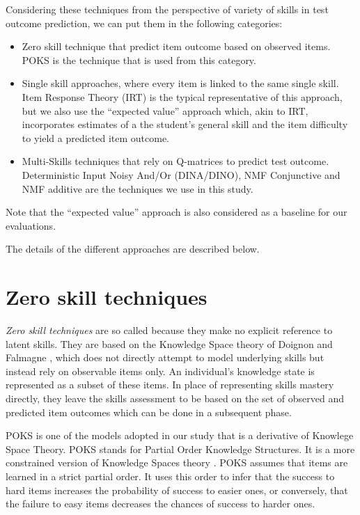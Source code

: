 Considering these techniques from the perspective of variety of skills in test outcome prediction, we can put them in the following categories: 

\begin{itemize}

\item Zero skill technique that predict item outcome based on observed items. POKS is the technique that is used from this category.
\item Single skill approaches, where every item is linked to the same single skill. Item Response Theory (IRT) is the typical representative of this approach, but we also use the ``expected value'' approach which, akin to IRT, incorporates estimates of a the student's general skill and the item difficulty to yield a predicted item outcome.
\item Multi-Skills techniques that rely on Q-matrices to predict test outcome.  Deterministic Input Noisy And/Or (DINA/DINO), NMF Conjunctive and \ac{NMF} additive are the techniques we use in this study.

\end{itemize}  
Note that the ``expected value'' approach is also considered as a baseline for our evaluations. 

The details of the different approaches are described below.

\section{Zero skill techniques}

\textit{Zero skill techniques} are so called because they make no explicit reference to latent skills.  They are based on the Knowledge Space theory of Doignon and Falmagne \citep{Doignon1999,desmarais:umuai:2006}, which does not directly attempt to model underlying skills but instead rely on observable items only.  An individual's knowledge state is represented as a subset of these items. In place of representing skills mastery directly, they leave the skills assessment to be based on the set of observed and predicted item outcomes which can be done in a subsequent phase. 

POKS is one of the models adopted in our study that is a derivative of Knowlege Space Theory.  POKS stands for Partial Order Knowledge Structures.  It is a more constrained version of Knowledge Spaces theory \citep{desmarais:umuai:1995}.  POKS assumes that items are learned in a strict partial order.  It uses this order to infer that the success to hard items increases the probability of success to easier ones, or conversely, that the failure to easy items decreases the chances of success to harder ones.

